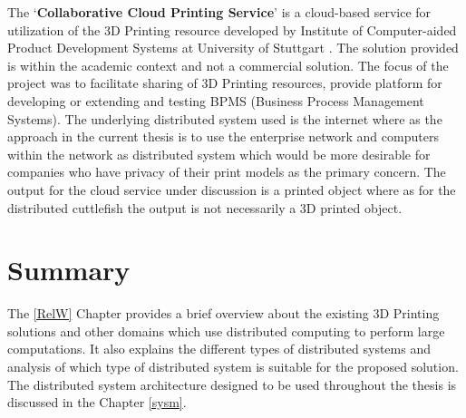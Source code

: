 The {\lq}\textbf{Collaborative Cloud Printing Service}{\rq} is a cloud-based service for utilization of the 3D Printing resource developed by Institute of Computer-aided Product Development Systems at University of Stuttgart \cite{Baumann2016}. The solution provided is within the academic context and not a commercial solution. The focus of the project was to facilitate sharing of 3D Printing resources, provide platform for developing or extending and testing BPMS (Business Process Management Systems). The underlying distributed system used is the internet where as the approach in the current thesis is to use the enterprise network and computers within the network as distributed system which would be more desirable for companies who have privacy of their print models as the primary concern. The output for the cloud service under discussion is a printed object where as for the distributed cuttlefish the output is not necessarily a 3D printed object.  

\section{Summary}

The \ref{RelW} Chapter provides a brief overview about the existing 3D Printing solutions and other domains which use distributed computing to perform large computations. It also explains the different types of distributed systems and analysis of which type of distributed system is suitable for the proposed solution. The distributed system architecture designed to be used throughout the thesis is discussed in the Chapter \ref{sysm}. 
